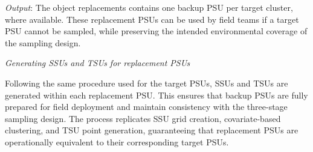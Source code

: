 \documentclass[
  10pt,
  b5paper,
  oneside]{book}
\begin{document}
\emph{Output}: The object replacements contains one backup PSU per target cluster, where available. These replacement PSUs can be used by field teams if a target PSU cannot be sampled, while preserving the intended environmental coverage of the sampling design.

\emph{Generating SSUs and TSUs for replacement PSUs}

Following the same procedure used for the target PSUs, SSUs and TSUs are generated within each replacement PSU. This ensures that backup PSUs are fully prepared for field deployment and maintain consistency with the three-stage sampling design. The process replicates SSU grid creation, covariate-based clustering, and TSU point generation, guaranteeing that replacement PSUs are operationally equivalent to their corresponding target PSUs.
\end{document}
